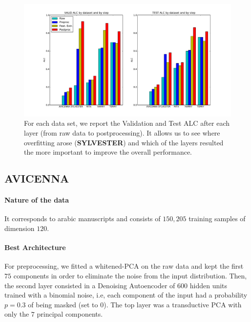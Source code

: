 \begin{figure}[t]
  \begin{center}
    \includegraphics[width=1.\linewidth]{article1/images/5steps.pdf}
    \caption{\label{fig:charts} For each data set, we report the Validation and Test ALC after each layer (from raw data to postprocessing). It allows us to see where overfitting arose ({\bf SYLVESTER}) and which of the layers resulted the more important to improve the overall performance.}
    \vspace{-0.2in}
  \end{center}
 \vspace*{-1mm}
\end{figure}


 
\subsection{AVICENNA}

\paragraph{Nature of the data}
It corresponds to arabic manuscripts and consists of $150,205$ training samples of dimension $120$.

\paragraph{Best Architecture}
For preprocessing, we fitted a whitened-PCA on the raw data and kept the first
$75$ components in order to eliminate the noise from the input distribution.
Then, the second layer consisted in a Denoising Autoencoder of $600$ hidden
units trained with a binomial noise, i.e, each component of the input had a
probability $p=0.3$ of being masked (set to 0). The top layer was a transductive PCA 
with only the $7$ principal components.

